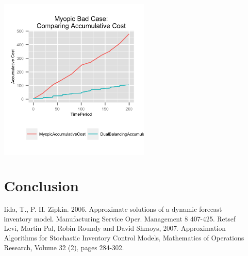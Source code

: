 \documentclass[twoside]{article}
\begin{document}
\begin{multicols}{2}
  \includegraphics[width=3.0in]{figures/MyopicBadAccumulativeCost.png}

\section{Conclusion}

\lipsum[7] %


\begin{thebibliography}{99} %

Iida, T., P. H. Zipkin. 2006. Approximate solutions of a dynamic forecast-inventory model. Manufacturing Service Oper. Management
8 407-425.
Retsef Levi, Martin Pal, Robin Roundy and David Shmoys, 2007. Approximation Algorithms for Stochastic Inventory Control Models, Mathematics of Operations Research, Volume 32 (2), pages 284-302.

\end{thebibliography}


\end{multicols}
\end{document}
